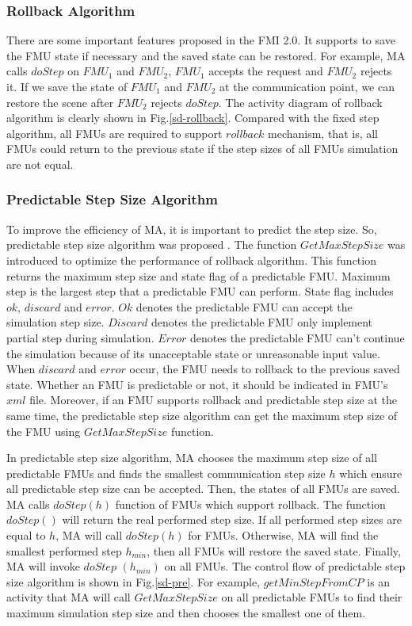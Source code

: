 \subsubsection{Rollback Algorithm}
There are some important features proposed in the FMI 2.0. It supports to save the FMU state if necessary and the saved state can be restored. For example, MA calls $doStep$ on $FMU_{1}$ and $FMU_{2}$, $FMU_{1}$ accepts the request and $FMU_{2}$ rejects it. If we save the state of $FMU_{1}$ and $FMU_{2}$ at the communication point, we can restore the scene after $FMU_{2}$ rejects $doStep$. The activity diagram of rollback algorithm \cite{BromanBGLMTW13} is clearly shown in Fig.\ref{sd-rollback}. Compared with the fixed step algorithm, all FMUs are required to support $rollback$ mechanism, that is, all FMUs could return to the previous state if the step sizes of all FMUs simulation are not equal.
\subsubsection{Predictable Step Size Algorithm}
To improve the efficiency of MA, it is important to predict the step size. So, predictable step size algorithm was proposed \cite{BromanBGLMTW13}. The function $GetMaxStepSize$ was introduced to optimize the performance of rollback algorithm. This function returns the maximum step size and state flag of a predictable FMU. Maximum step is the largest step that a predictable FMU can perform. State flag includes $ok$, $discard$ and $error$. $Ok$ denotes the predictable FMU can accept the simulation step size. $Discard$ denotes the predictable FMU only implement partial step during simulation. $Error$ denotes the predictable FMU can't continue the simulation because of its unacceptable state or unreasonable input value. When $discard$ and $error$ occur, the FMU needs to rollback to the previous saved state. Whether an FMU is predictable or not, it should be indicated in FMU's $xml$ file. Moreover, if an FMU supports rollback and predictable step size at the same time, the predictable step size algorithm can get the maximum step size of the FMU using $GetMaxStepSize$ function.

In predictable step size algorithm, MA chooses the maximum step size of all predictable FMUs and finds the smallest communication step size $h$ which ensure all predictable step size can be accepted. Then, the states of all FMUs are saved. MA calls $doStep(h)$ function of FMUs which support rollback. The function $doStep()$ will return the real performed step size. If all performed step sizes are equal to $h$, MA will call $doStep(h)$ for FMUs. Otherwise, MA will find the smallest performed step $h_{min}$, then all FMUs will restore the saved state. Finally, MA will invoke $doStep$ $(h_{min})$ on all FMUs. The control flow of predictable step size algorithm is shown in Fig.\ref{sd-pre}. For example, $getMinStepFromCP$ is an activity that MA will call $GetMaxStepSize$ on all predictable FMUs to find their maximum simulation step size and then chooses the smallest one of them. 

